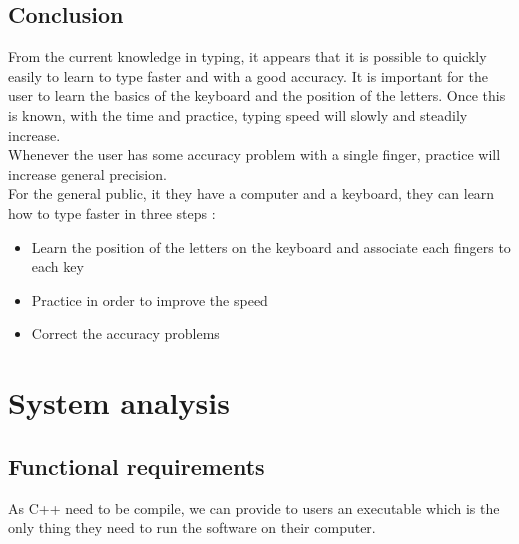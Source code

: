 \chapter{Conclusion}
From the current knowledge in typing, it appears that it is possible to quickly easily to learn to type faster and with a good accuracy. It is important for the user to learn the basics of the keyboard and the position of the letters. Once this is known, with the time and practice, typing speed will slowly and steadily increase.\\
Whenever the user has some accuracy problem with a single finger, practice will increase general precision.\\
For the general public, it they have a computer and a keyboard, they can learn how to type faster in three steps :
\begin{itemize}
	\item Learn the position of the letters on the keyboard and associate each fingers to each key
	\item Practice in order to improve the speed
	\item Correct the accuracy problems
\end{itemize}

\begin{flushleft}
	
	
\end{flushleft}

\part{System analysis}

\chapter{Functional requirements}
As C++ need to be compile, we can provide to users an executable which is the only thing they need to run the software on their computer.

